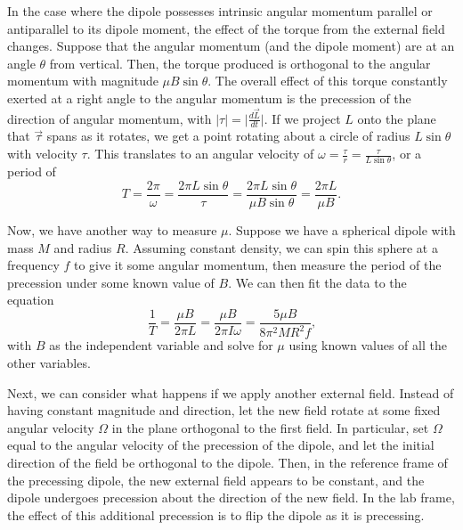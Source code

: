 \documentclass{amsart}
\numberwithin{equation}{section}
\begin{document}
In the case where the dipole possesses intrinsic angular momentum parallel or antiparallel to its dipole moment, the effect of the torque from the external field changes. Suppose that the angular momentum (and the dipole moment) are at an angle $\theta$ from vertical. Then, the torque produced is orthogonal to the angular momentum with magnitude $\mu B\sin\theta$. The overall effect of this torque constantly exerted at a right angle to the angular momentum is the precession of the direction of angular momentum, with $|\tau|=\Big|\frac{d\vec{L}}{dt}\Big|$. If we project $L$ onto the plane that $\vec{\tau}$ spans as it rotates, we get a point rotating about a circle of radius $L\sin\theta$ with velocity $\tau$. This translates to an angular velocity of $\omega=\frac{\tau}{r}=\frac{\tau}{L\sin\theta}$, or a period of
\begin{equation}
\label{clasperiod}
T=\frac{2\pi}{\omega}=\frac{2\pi L\sin\theta}{\tau}=\frac{2\pi L\sin\theta}{\mu B\sin\theta}=\frac{2\pi L}{\mu B}\text{.}
\end{equation}

Now, we have another way to measure $\mu$. Suppose we have a spherical dipole with mass $M$ and radius $R$. Assuming constant density, we can spin this sphere at a frequency $f$ to give it some angular momentum, then measure the period of the precession under some known value of $B$. We can then fit the data to the equation
\begin{equation}
\frac{1}{T}=\frac{\mu B}{2\pi L}=\frac{\mu B}{2\pi I\omega}=\frac{5\mu B}{8\pi^2MR^2f}\text{,}
\end{equation}
with $B$ as the independent variable and solve for $\mu$ using known values of all the other variables.

Next, we can consider what happens if we apply another external field. Instead of having constant magnitude and direction, let the new field rotate at some fixed angular velocity $\Omega$ in the plane orthogonal to the first field. In particular, set $\Omega$ equal to the angular velocity of the precession of the dipole, and let the initial direction of the field be orthogonal to the dipole. Then, in the reference frame of the precessing dipole, the new external field appears to be constant, and the dipole undergoes precession about the direction of the new field. In the lab frame, the effect of this additional precession is to flip the dipole as it is precessing. 
\end{document}
